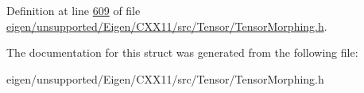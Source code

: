Definition at line \hyperlink{eigen_2unsupported_2_eigen_2_c_x_x11_2src_2_tensor_2_tensor_morphing_8h_source_l00609}{609} of file \hyperlink{eigen_2unsupported_2_eigen_2_c_x_x11_2src_2_tensor_2_tensor_morphing_8h_source}{eigen/unsupported/\+Eigen/\+C\+X\+X11/src/\+Tensor/\+Tensor\+Morphing.\+h}.



The documentation for this struct was generated from the following file\+:\begin{DoxyCompactItemize}
\item 
eigen/unsupported/\+Eigen/\+C\+X\+X11/src/\+Tensor/\+Tensor\+Morphing.\+h\end{DoxyCompactItemize}
